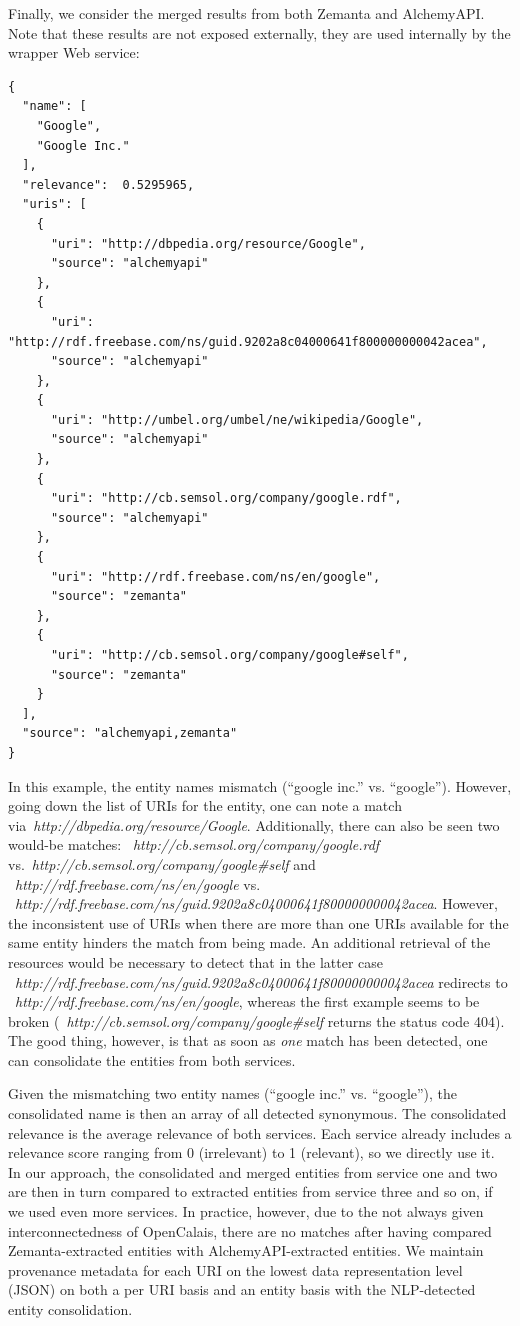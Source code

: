 \documentclass[twocolumn]{article}
\newcommand{\nofootnote}[1]{~#1}
\begin{document}
Finally, we consider the merged results from both Zemanta and AlchemyAPI. Note that these results are not exposed externally, they are used internally by the wrapper Web service:
\begin{lstlisting}
{
  "name": [
    "Google",
    "Google Inc."
  ],
  "relevance":  0.5295965,
  "uris": [
    {
      "uri": "http://dbpedia.org/resource/Google",
      "source": "alchemyapi"
    },
    {
      "uri": "http://rdf.freebase.com/ns/guid.9202a8c04000641f800000000042acea",
      "source": "alchemyapi"
    },
    {
      "uri": "http://umbel.org/umbel/ne/wikipedia/Google",
      "source": "alchemyapi"
    },
    {
      "uri": "http://cb.semsol.org/company/google.rdf",
      "source": "alchemyapi"
    },
    {
      "uri": "http://rdf.freebase.com/ns/en/google",
      "source": "zemanta"
    },
    {
      "uri": "http://cb.semsol.org/company/google#self",
      "source": "zemanta"
    }
  ],
  "source": "alchemyapi,zemanta"
}
\end{lstlisting}

In this example, the entity names mismatch (``google inc.'' vs. ``google''). However, going down the list of URIs for
the entity, one can note a match via\nofootnote{\textit{http://dbpedia.org/resource/Google}}. Additionally, there can also
be seen two would-be matches: \nofootnote{\textit{http://cb.semsol.org/company/google.rdf}}
vs.\nofootnote{\textit{http://cb.semsol.org/company/google\#self}} and
\nofootnote{\textit{http://rdf.freebase.com/ns/en/google}} vs.
\nofootnote{\textit{http://rdf.freebase.com/ns/guid.9202a8c04000641f800000000042acea}}. However, the inconsistent use of
URIs when there are more than one URIs available for the same entity hinders the match from being made. An additional
retrieval of the resources would be necessary to detect that in the latter case
\nofootnote{\textit{http://rdf.freebase.com/ns/guid.9202a8c04000641f800000000042acea}} redirects to
\nofootnote{\textit{http://rdf.freebase.com/ns/en/google}}, whereas the first example seems to be broken
(\nofootnote{\textit{http://cb.semsol.org/company/google\#self}} returns the status code 404). The good thing, however, is
that as soon as \emph{one} match has been detected, one can consolidate the entities from both services.

Given the mismatching two entity names (``google inc.'' vs. ``google''), the consolidated name is then an array of all
detected synonymous. The consolidated relevance is the average relevance of both services. Each service already includes a relevance score ranging from
0 (irrelevant) to 1 (relevant), so we directly use it. In our approach, the consolidated and merged entities from
service one and two are then in turn compared to extracted entities from service three and so on, if we used even more
services. In practice, however, due to the not always given interconnectedness of OpenCalais, there are no matches
after having compared Zemanta-extracted entities with AlchemyAPI-extracted entities. We maintain provenance metadata for each URI on the lowest data representation level (JSON)
on both a per URI basis and an entity basis with the NLP-detected entity consolidation.
\end{document}
